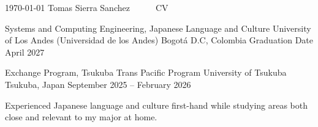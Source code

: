 \documentclass[11pt, a4paper]{awesome-cv}
\begin{document}
\makecvheader[C]

\makecvfooter
  {\today}
  {Tomas Sierra Sanchez~~~\textperiodcentered~~~CV}
  {\thepage}


\begin{cventries}

  \cventry
    {Systems and Computing Engineering, Japanese Language and Culture}
    {University of Los Andes (Universidad de los Andes)}
    {Bogot\'a D.C, Colombia}
    {Graduation Date April 2027}
    {}

  \cventry
    {Exchange Program, Tsukuba Trans Pacific Program}
    {University of Tsukuba}
    {Tsukuba, Japan}
    {September 2025 -- February 2026}
    {
      \begin{cvitems}
        \item {Experienced Japanese language and culture first-hand while studying areas both close and relevant to my major at home.}
      \end{cvitems}
    }

\end{cventries}

\end{document}
